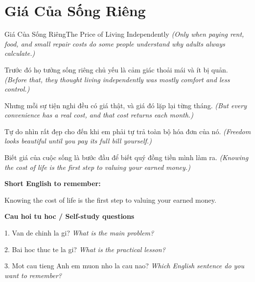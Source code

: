 \section{Giá Của Sống Riêng}
\begin{truyen}{Giá Của Sống Riêng}{The Price of Living Independently}
\textit{(Only when paying rent, food, and small repair costs do some people understand why adults always calculate.)}

Trước đó họ tưởng sống riêng chủ yếu là cảm giác thoải mái và ít bị quản.
\textit{(Before that, they thought living independently was mostly comfort and less control.)}

Nhưng mỗi sự tiện nghi đều có giá thật, và giá đó lặp lại từng tháng.
\textit{(But every convenience has a real cost, and that cost returns each month.)}

Tự do nhìn rất đẹp cho đến khi em phải tự trả toàn bộ hóa đơn của nó.
\textit{(Freedom looks beautiful until you pay its full bill yourself.)}

\end{truyen}

\begin{baihoc}
Biết giá của cuộc sống là bước đầu để biết quý đồng tiền mình làm ra.
\textit{(Knowing the cost of life is the first step to valuing your earned money.)}
\end{baihoc}

\begin{ghinhoanh}
\textbf{Short English to remember:}

Knowing the cost of life is the first step to valuing your earned money.

\end{ghinhoanh}

\begin{tuhocnhanh}
\textbf{Cau hoi tu hoc / Self-study questions}

1. Van de chinh la gi? \textit{What is the main problem?}

2. Bai hoc thuc te la gi? \textit{What is the practical lesson?}

3. Mot cau tieng Anh em muon nho la cau nao? \textit{Which English sentence do you want to remember?}
\end{tuhocnhanh}
\ngancach

